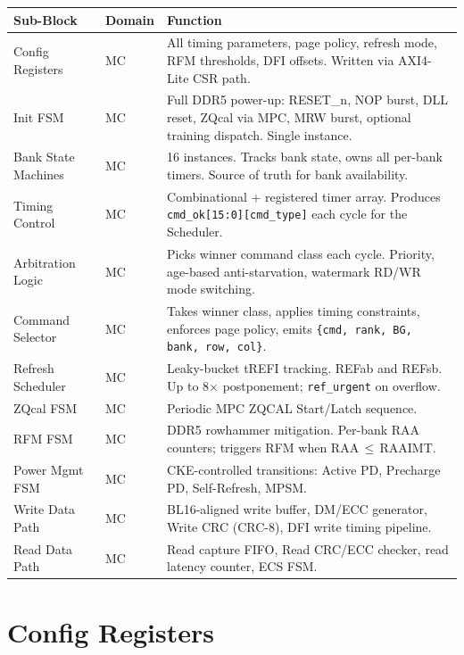 \documentclass[10pt,a4paper]{article}
\newcommand{\Th}[1]{\cellcolor{thbg}\textbf{\small\color{acc1}#1}}
\newcommand{\RA}{\rowcolor{white}}
\newcommand{\RB}{\rowcolor{altbg}}
\begin{document}
\begin{center}
\begin{tabularx}{\linewidth}{@{} l l X @{}}
\toprule
\Th{Sub-Block} & \Th{Domain} & \Th{Function} \\
\midrule
\RA Config Registers   & MC & All timing parameters, page policy, refresh mode, RFM thresholds, DFI offsets. Written via AXI4-Lite CSR path. \\
\RB Init FSM           & MC & Full DDR5 power-up: RESET\_n, NOP burst, DLL reset, ZQcal via MPC, MRW burst, optional training dispatch. Single instance. \\
\RA Bank State Machines& MC & 16 instances. Tracks bank state, owns all per-bank timers. Source of truth for bank availability. \\
\RB Timing Control     & MC & Combinational + registered timer array. Produces \texttt{cmd\_ok[15:0][cmd\_type]} each cycle for the Scheduler. \\
\RA Arbitration Logic  & MC & Picks winner command class each cycle. Priority, age-based anti-starvation, watermark RD/WR mode switching. \\
\RB Command Selector   & MC & Takes winner class, applies timing constraints, enforces page policy, emits \texttt{\{cmd,\,rank,\,BG,\,bank,\,row,\,col\}}. \\
\RA Refresh Scheduler  & MC & Leaky-bucket tREFI tracking. REFab and REFsb. Up to 8$\times$ postponement; \texttt{ref\_urgent} on overflow. \\
\RB ZQcal FSM          & MC & Periodic MPC ZQCAL Start/Latch sequence. \\
\RA RFM FSM            & MC & DDR5 rowhammer mitigation. Per-bank RAA counters; triggers RFM when RAA\,$\leq$\,RAAIMT. \\
\RB Power Mgmt FSM     & MC & CKE-controlled transitions: Active PD, Precharge PD, Self-Refresh, MPSM. \\
\RA Write Data Path    & MC & BL16-aligned write buffer, DM/ECC generator, Write CRC (CRC-8), DFI write timing pipeline. \\
\RB Read Data Path     & MC & Read capture FIFO, Read CRC/ECC checker, read latency counter, ECS FSM. \\
\bottomrule
\end{tabularx}
\end{center}

\section{Config Registers}
\end{document}
